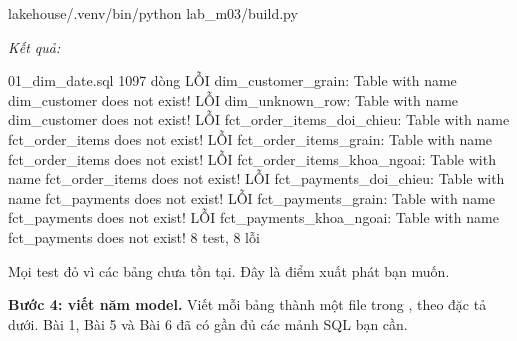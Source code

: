 \begin{codeblock}
lakehouse/.venv/bin/python lab_m03/build.py
\end{codeblock}
\textit{Kết quả:}
\begin{codeblock}
01_dim_date.sql               1097 dòng
LỖI  dim_customer_grain: Table with name dim_customer does not exist!
LỖI  dim_unknown_row: Table with name dim_customer does not exist!
LỖI  fct_order_items_doi_chieu: Table with name fct_order_items does not exist!
LỖI  fct_order_items_grain: Table with name fct_order_items does not exist!
LỖI  fct_order_items_khoa_ngoai: Table with name fct_order_items does not exist!
LỖI  fct_payments_doi_chieu: Table with name fct_payments does not exist!
LỖI  fct_payments_grain: Table with name fct_payments does not exist!
LỖI  fct_payments_khoa_ngoai: Table with name fct_payments does not exist!
8 test, 8 lỗi
\end{codeblock}

Mọi test đỏ vì các bảng chưa tồn tại. Đây là điểm xuất phát bạn muốn.

\textbf{Bước 4: viết năm model.} Viết mỗi bảng thành một file trong , theo đặc tả dưới. Bài 1, Bài 5 và Bài 6 đã có gần đủ các mảnh SQL bạn cần.

